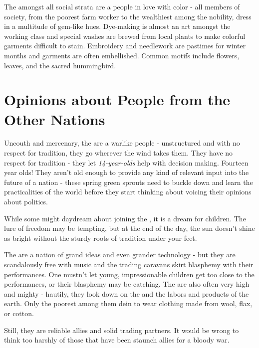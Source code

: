 \documentclass[blue]{GL2020}
\begin{document}
The \pFarm{} amongst all social strata are a people in love with color - all members of society, from the poorest farm worker to the wealthiest among the nobility, dress in a multitude of gem-like hues.  Dye-making is almost an art amongst the working class and special washes are brewed from local plants to make colorful garments difficult to stain.  Embroidery and needlework are pastimes for winter months and garments are often embellished.  Common motifs include flowers, leaves, and the sacred hummingbird.

\section*{Opinions about People from the Other Nations}

Uncouth and mercenary, the \pShippies{} are a warlike people - unstructured and with no respect for tradition, they go wherever the wind takes them.  They have no respect for tradition - they let \emph{14-year-olds} help with decision making.  Fourteen year olds!  They aren’t old enough to provide any kind of relevant input into the future of a nation - these spring green sprouts need to buckle down and learn the practicalities of the world before they start thinking about voicing their opinions about politics.

While some might daydream about joining the \pShippies{}, it is a dream for children.   The lure of freedom may be tempting, but at the end of the day, the sun doesn’t shine as bright without the sturdy roots of tradition under your feet.

The \pTech{} are a nation of grand ideas and even grander technology - but they are scandalously free with music and the trading caravans skirt blasphemy with their performances.  One mustn’t let young, impressionable children get too close to the performances, or their blasphemy may be catching.  The \pTech{} are also often very high and mighty - hautily, they look down on the \pFarm{} and the labors and products of the earth.  Only the poorest among them dein to wear clothing made from wool, flax, or cotton.

Still, they are reliable allies and solid trading partners. It would be wrong to think too harshly of those that have been staunch allies for a bloody war.
\end{document}
